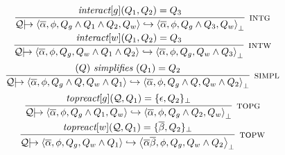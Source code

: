 \documentclass{article}
\newcommand{\multi}[1]{{\overline{#1}}}
\newcommand{\Q}{\mathcal{Q}}
\newcommand{\arrowish}{|\!\!\!\rightarrow}
\newcommand{\rulen}[1]{\textsc{#1}}
\newcommand{\angles}[1]{\left\langle #1 \right\rangle}
\begin{document}
\[\begin{array}{c}
\infer[\rulen{intg}]
  {\Q \arrowish \angles{\multi{\alpha}, \phi, Q_g \land Q_1 \land Q_2, Q_w} \hookrightarrow
                \angles{\multi{\alpha}, \phi, Q_g \land Q_3, Q_w}_\bot}
  {\interact{g}{Q_1, Q_2} = Q_3}
\\[1mm]
\infer[\rulen{intw}]
  {\Q \arrowish \angles{\multi{\alpha}, \phi, Q_g, Q_w \land Q_1 \land Q_2} \hookrightarrow
                \angles{\multi{\alpha}, \phi, Q_g, Q_w \land Q_3}_\bot}
  {\interact{w}{Q_1, Q_2} = Q_3}
\\[2mm]

\infer[\rulen{simpl}]
  {\Q \arrowish \angles{\multi{\alpha}, \phi, Q_g \land Q, Q_w \land Q_1} \hookrightarrow
                \angles{\multi{\alpha}, \phi, Q_g \land Q, Q_w \land Q_2}_\bot}
  {(Q) ~ \textit{simplifies} ~ (Q_1) = Q_2}
\\[2mm]

\infer[\rulen{topg}]
  {\Q \arrowish \angles{\multi{\alpha}, \phi, Q_g \land Q_1, Q_w} \hookrightarrow
                \angles{\multi{\alpha}, \phi, Q_g \land Q_2, Q_w}_\bot}
  {\topreact{g}{\Q, Q_1} = \{ \epsilon, Q_2 \}_\bot}
\\[1mm]
\infer[\rulen{topw}]
  {\Q \arrowish \angles{\multi{\alpha},               \phi, Q_g, Q_w \land Q_1} \hookrightarrow
                \angles{\multi{\alpha} \multi{\beta}, \phi, Q_g, Q_w \land Q_2}_\bot}
  {\topreact{w}{\Q, Q_1} = \{ \multi{\beta}, Q_2 \}_\bot}

\end{array}
\]
\end{document}
